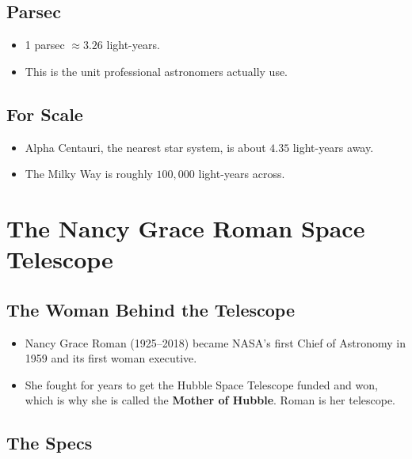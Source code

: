 \documentclass[11pt]{article}
\begin{document}
\subsection{Parsec}

\begin{itemize}
\item 1 parsec $\approx 3.26$ light-years.
\item This is the unit professional astronomers actually use.
\end{itemize}

\subsection{For Scale}

\begin{itemize}
\item Alpha Centauri, the nearest star system, is about $4.35$ light-years away.
\item The Milky Way is roughly $100{,}000$ light-years across.
\end{itemize}

\section{The Nancy Grace Roman Space Telescope}

\subsection{The Woman Behind the Telescope}

\begin{itemize}
\item Nancy Grace Roman (1925--2018) became NASA's first Chief of Astronomy in 1959
and its first woman executive.
\item She fought for years to get the Hubble Space Telescope funded and won, which is
why she is called the \textbf{Mother of Hubble}. Roman is her telescope.
\end{itemize}

\subsection{The Specs}
\end{document}
